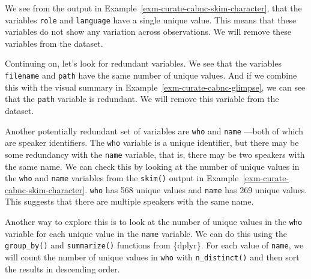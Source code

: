 \documentclass[
  letterpaper,
  krantz1]{latex/krantz-mod}
\theoremstyle{definition}
\theoremstyle{definition}
\theoremstyle{remark}
\begin{document}
We see from the output in Example~\ref{exm-curate-cabnc-skim-character},
that the variables \texttt{role} and \texttt{language} have a single
unique value. This means that these variables do not show any variation
across observations. We will remove these variables from
the dataset.

Continuing on, let's look for redundant variables. We see that the
variables \texttt{filename} and \texttt{path} have the same number of
unique values. And if we combine this with the visual summary in
Example~\ref{exm-curate-cabnc-glimpse}, we can see that the
\texttt{path} variable is redundant. We will remove this variable from
the dataset.

Another potentially redundant set of variables are \texttt{who} and
\texttt{name} ---both of which are speaker identifiers. The \texttt{who}
variable is a unique identifier, but there may be some redundancy with
the \texttt{name} variable, that is, there may be two speakers with the
same name. We can check this by looking at the number of unique values
in the \texttt{who} and \texttt{name} variables from the \texttt{skim()}
output in Example~\ref{exm-curate-cabnc-skim-character}. \texttt{who}
has 568 unique values and \texttt{name} has 269 unique values. This
suggests that there are multiple speakers with the same name.

Another way to explore this is to look at the number of unique values in
the \texttt{who} variable for each unique value in the \texttt{name}
variable. We can do this using the \texttt{group\_by()} and
\texttt{summarize()} functions from \{dplyr\}. For each value of
\texttt{name}, we will count the number of unique values in \texttt{who}
with \texttt{n\_distinct()} and then sort the results in descending
order.
\end{document}
